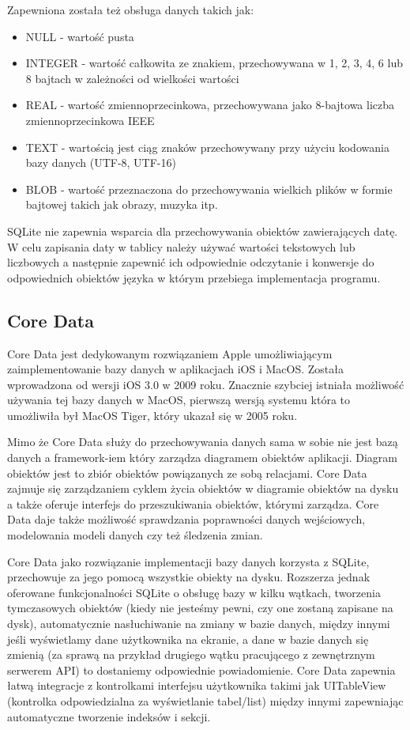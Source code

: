 Zapewniona została też obsługa danych takich jak: 

\begin{itemize}
	\item NULL - wartość pusta
	\item INTEGER - wartość całkowita ze znakiem, przechowywana w 1, 2, 3, 4, 6 lub 8 bajtach w zależności od wielkości wartości
	\item REAL - wartość zmiennoprzecinkowa, przechowywana jako 8-bajtowa liczba zmiennoprzecinkowa IEEE
	\item TEXT - wartością jest ciąg znaków przechowywany przy użyciu kodowania bazy danych (UTF-8, UTF-16)
	\item BLOB - wartość przeznaczona do przechowywania wielkich plików w formie bajtowej takich jak obrazy, muzyka itp. 
\end{itemize}

SQLite nie zapewnia wsparcia dla przechowywania obiektów zawierających datę. W celu zapisania daty w tablicy należy używać wartości tekstowych lub liczbowych a następnie zapewnić ich odpowiednie odczytanie i konwersje do odpowiednich obiektów języka w którym przebiega implementacja programu. 

\subsection{Core Data}

Core Data jest dedykowanym rozwiązaniem Apple umożliwiającym zaimplementowanie bazy danych w aplikacjach iOS i MacOS. Została wprowadzona od wersji iOS 3.0 w 2009 roku. Znacznie szybciej istniała możliwość używania tej bazy danych w MacOS,  pierwszą wersją systemu która to umożliwiła był MacOS Tiger, który ukazał się w 2005 roku.\par

Mimo że Core Data służy do przechowywania danych sama w sobie nie jest bazą danych a framework-iem który zarządza diagramem obiektów aplikacji. Diagram obiektów jest to zbiór obiektów powiązanych ze sobą relacjami. Core Data zajmuje się zarządzaniem cyklem życia obiektów w diagramie obiektów na dysku a także oferuje interfejs do przeszukiwania obiektów, którymi zarządza. Core Data daje także możliwość sprawdzania poprawności danych wejściowych, modelowania modeli danych czy też śledzenia zmian. \par

Core Data jako rozwiązanie implementacji bazy danych korzysta z SQLite, przechowuje za jego pomocą wszystkie obiekty na dysku. Rozszerza jednak oferowane funkcjonalności SQLite o obsługę bazy w kilku wątkach, tworzenia tymczasowych obiektów (kiedy nie jesteśmy pewni, czy one zostaną zapisane na dysk), automatycznie nasłuchiwanie na zmiany w bazie danych, między innymi jeśli wyświetlamy dane użytkownika na ekranie, a dane w bazie danych się zmienią (za sprawą na przykład drugiego wątku pracującego z zewnętrznym serwerem API) to dostaniemy odpowiednie powiadomienie. Core Data zapewnia łatwą integracje z kontrolkami interfejsu użytkownika takimi jak UITableView (kontrolka odpowiedzialna za wyświetlanie tabel/list) między innymi zapewniając automatyczne tworzenie indeksów i sekcji.\par

